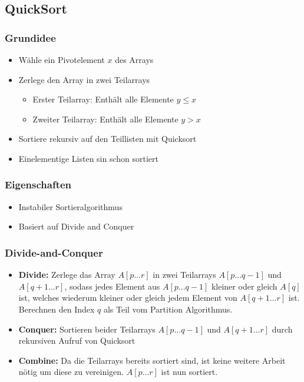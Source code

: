 	\subsection{QuickSort}
		\begin{minipage}[t]{0.5\textwidth}
			\subsubsection{Grundidee}
				\begin{itemize}
					\item Wähle ein Pivotelement $x$ des Arrays
					\item Zerlege den Array in zwei Teilarrays
					\begin{itemize}
						\item Erster Teilarray: Enthält alle Elemente $y \leq x$
						\item Zweiter Teilarray: Enthält alle Elemente $y > x$ 
					\end{itemize}
					\item Sortiere rekursiv auf den Teillisten mit Quicksort
					\item Einelementige Listen sin schon sortiert
				\end{itemize}
			\end{minipage}
			\begin{minipage}[t]{0.45\textwidth}
				\subsubsection{Eigenschaften}
					\begin{itemize}
						\item Instabiler Sortieralgorithmus
						\item Basiert auf Divide and Conquer
					\end{itemize}
			\end{minipage}
		
		\subsubsection{Divide-and-Conquer}
			\begin{itemize}
				\item \textbf{Divide:} Zerlege das Array $A[p...r]$ in zwei Teilarrays $A[p...q-1]$ 
					und $A[q+1...r]$, sodass jedes Element aus $A[p...q-1]$ kleiner oder gleich $A[q]$
					ist, welches wiederum kleiner oder gleich jedem Element von $A[q+1...r]$ ist. 
					Berechnen den Index $q$ als Teil vom Partition Algorithmus.
				\item \textbf{Conquer:} Sortieren beider Teilarrays $A[p...q-1]$ und $A[q+1...r]$ durch
					rekursiven Aufruf von Quicksort
				\item \textbf{Combine:} Da die Teilarrays bereits sortiert sind, ist keine weitere Arbeit
					nötig um diese zu vereinigen. $A[p...r]$ ist nun sortiert. 
			\end{itemize}
					
